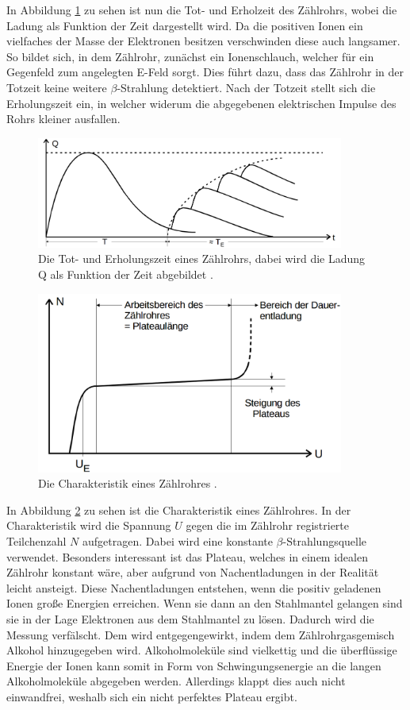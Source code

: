 \documentclass[
  bibliography=totoc,     %
  captions=tableheading,  %
  titlepage=firstiscover, %
]{scrartcl}
\begin{document}
\noindent
In Abbildung \ref{fig:V7033} zu sehen ist nun die Tot- und Erholzeit des
Zählrohrs, wobei die Ladung als Funktion der Zeit dargestellt wird.
Da die positiven Ionen ein vielfaches der Masse der Elektronen besitzen
verschwinden diese auch langsamer. So bildet sich, in dem Zählrohr, zunächst ein
Ionenschlauch, welcher für ein Gegenfeld zum angelegten E-Feld sorgt. Dies führt dazu, dass das
Zählrohr in der Totzeit keine weitere $\beta$-Strahlung detektiert.
Nach der Totzeit stellt sich die Erholungszeit ein, in welcher widerum die
abgegebenen elektrischen Impulse des Rohrs kleiner ausfallen.
\clearpage
\begin{figure}[htb]
  \centering
  \includegraphics[width=0.9\textwidth]{V7033.png}
  \caption{Die Tot- und Erholungszeit eines Zählrohrs, dabei wird die Ladung Q
  als Funktion der Zeit abgebildet \cite{anleitung}.}
  \label{fig:V7033}
\end{figure}
\begin{figure}[htb]
  \centering
  \includegraphics[width=0.9\textwidth]{V7034.png}
  \caption{Die Charakteristik eines Zählrohres \cite{anleitung}.}
  \label{fig:V7034}
\end{figure}

\noindent
In Abbildung \ref{fig:V7034} zu sehen ist die Charakteristik eines Zählrohres.
In der Charakteristik wird die Spannung $U$ gegen die im Zählrohr registrierte
Teilchenzahl $N$ aufgetragen. Dabei wird eine konstante $\beta$-Strahlungsquelle verwendet.
Besonders interessant ist das Plateau, welches in einem idealen Zählrohr
konstant wäre, aber aufgrund von Nachentladungen in der Realität leicht ansteigt.
Diese Nachentladungen entstehen, wenn die positiv geladenen Ionen große Energien
erreichen. Wenn sie dann an den Stahlmantel gelangen sind sie in der Lage
Elektronen aus dem Stahlmantel zu lösen. Dadurch wird die Messung verfälscht.
Dem wird entgegengewirkt, indem dem Zählrohrgasgemisch Alkohol hinzugegeben wird.
Alkoholmoleküle sind vielkettig und die überflüssige Energie der Ionen kann
somit in Form von Schwingungsenergie an die langen Alkoholmoleküle abgegeben werden.
Allerdings klappt dies auch nicht einwandfrei, weshalb sich ein nicht perfektes
Plateau ergibt.
\end{document}
